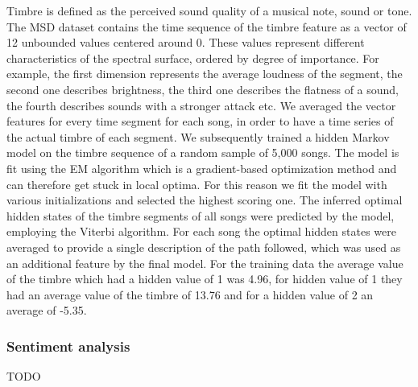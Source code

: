 \documentclass[acmtog]{acmart}
\begin{document}
Timbre is defined as the perceived sound quality of a musical note, sound or tone. The MSD dataset contains the time sequence of the timbre feature as a vector of 12 unbounded values centered around 0. These values represent different characteristics of the spectral
surface, ordered by degree of importance. For example, the first dimension represents the average
loudness of the segment, the second one describes brightness, the third one describes the flatness of a sound, the fourth describes sounds with a stronger attack etc. We averaged the vector features for every time segment for each song, in order to have a time series of the actual timbre of each segment.
We subsequently trained a hidden Markov model on the timbre sequence of a random sample of 5,000 songs. The model is fit using the EM algorithm which is a gradient-based optimization method and can therefore get stuck in local optima. For this reason we fit the model with various initializations and selected the highest scoring one.
The inferred optimal hidden states of the timbre segments of all songs were predicted by the model, employing the Viterbi algorithm.
For each song the optimal hidden states were averaged to provide a single description of the path followed, which was used as an additional feature by the final model.
For the training data the average value of the timbre which had a hidden value of 1 was 4.96, for hidden value of 1 they had an average value of the timbre of 13.76 and for a hidden value of 2 an average of -5.35.

\subsubsection{Sentiment analysis}

TODO


\end{document}
